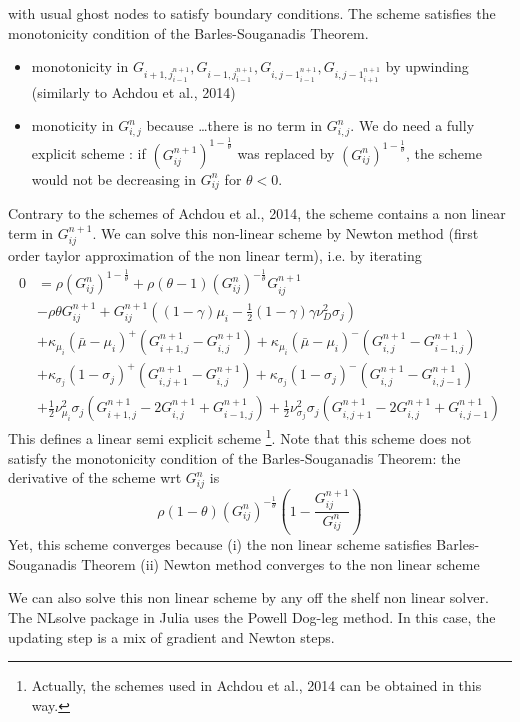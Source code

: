 \documentclass[english]{article}
\begin{document}
with usual ghost nodes to satisfy boundary conditions.
The scheme satisfies the monotonicity condition of the Barles-Souganadis Theorem. 
\begin{itemize}
	\item monotonicity in $G_{i+1, j}_{i-1}^{n+1}, G_{i-1, j}_{i-1}^{n+1}, G_{i, j-1}_{i-1}^{n+1}, G_{i, j-1}_{i+1}^{n+1}$ by upwinding (similarly to Achdou et al., 2014)
	\item monoticity in $G_{i, j}^{n}$  because \dots there is  no term in $G_{i, j}^{n}$. We do need a fully explicit scheme : if $(G_{ij}^{n+1})^{1-\frac{1}{\theta}}$ was replaced  by $(G_{ij}^{n})^{1-\frac{1}{\theta}}$, the scheme would not be decreasing in $G_{ij}^{n}$ for $\theta < 0$.
\end{itemize}
Contrary to the schemes of Achdou et al., 2014,  the scheme contains a non linear term in $G_{ij}^{n+1}$. We can solve this non-linear scheme by Newton method (first order taylor approximation of the non linear term), i.e. by iterating
\begin{align*}
	0&= \rho (G_{ij}^{n})^{1-\frac{1}{\theta}}+ \rho  (\theta-1) (G_{ij}^{n})^{-\frac{1}{\theta}}G_{ij}^{n+1}\\
	&- \rho \theta G_{ij}^{{n+1}}+G_{ij}^{n+1}((1-\gamma)\mu_i-\frac{1}{2}(1-\gamma)\gamma\nu_D^2\sigma_j)\\
	&+\kappa_{\mu_i}(\bar{\mu}-\mu_i)^+(G_{i+1, j}^{n+1}-G_{i, j}^{n+1}) +\kappa_{\mu_i}(\bar{\mu}-\mu_i)^-(G_{i, j}^{n+1}-G_{i-1, j}^{n+1})\\
	&+\kappa_{\sigma_j}(1-\sigma_j)^+(G_{i, j+1}^{n+1}-G_{i,j}^{n+1}) +\kappa_{\sigma_j}(1-\sigma_j)^-(G_{i, j}^{n+1}-G_{i,j-1}^{n+1})\\
	&+\frac{1}{2}\nu_{\mu_i}^{2}\sigma_j(G_{i+1, j}^{n+1} - 2 G_{i, j}^{n+1} + G_{i-1, j}^{n+1})+\frac{1}{2}\nu_{\sigma_j}^{2}\sigma_j(G_{i, j+1}^{n+1} - 2 G_{i, j}^{n+1} + G_{i, j-1}^{n+1})
\end{align*}
This defines a linear semi explicit scheme \footnote{Actually, the schemes used in Achdou et al., 2014 can be obtained in this way.}. Note that this scheme does not satisfy the monotonicity condition of the Barles-Souganadis Theorem: the derivative of the scheme wrt $G_{ij}^{n}$ is 
$$\rho (1- \theta)(G_{ij}^{n})^{-\frac{1}{\theta}} (1- \frac{G_{ij}^{n+1}}{G_{ij}^{n}})$$
Yet, this scheme converges because (i) the non linear scheme satisfies Barles-Souganadis Theorem (ii) Newton method converges to the non linear scheme


We can also solve this non linear scheme by any off the shelf non linear solver. The NLsolve package in Julia uses the Powell Dog-leg method. In this case, the updating step is a mix of gradient and Newton steps. 
\end{document}
